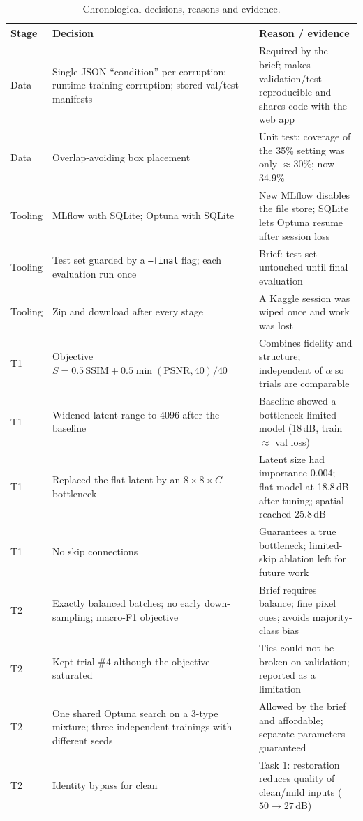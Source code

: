\documentclass[conference]{IEEEtran}
\begin{document}
\begin{table}[t]
\caption{Chronological decisions, reasons and evidence.}
\label{tab:log}
\centering\footnotesize
\begin{tabular}{@{}lp{6.4cm}p{8.6cm}@{}}
\toprule
Stage & Decision & Reason / evidence\\
\midrule
Data & Single JSON ``condition'' per corruption; runtime training corruption; stored val/test manifests & Required by the brief; makes validation/test reproducible and shares code with the web app\\
Data & Overlap-avoiding box placement & Unit test: coverage of the 35\% setting was only $\approx$30\%; now 34.9\%\\
Tooling & MLflow with SQLite; Optuna with SQLite & New MLflow disables the file store; SQLite lets Optuna resume after session loss\\
Tooling & Test set guarded by a \texttt{--final} flag; each evaluation run once & Brief: test set untouched until final evaluation\\
Tooling & Zip and download after every stage & A Kaggle session was wiped once and work was lost\\
T1 & Objective $S=0.5\,\mathrm{SSIM}+0.5\min(\mathrm{PSNR},40)/40$ & Combines fidelity and structure; independent of $\alpha$ so trials are comparable\\
T1 & Widened latent range to 4096 after the baseline & Baseline showed a bottleneck-limited model (18\,dB, train $\approx$ val loss)\\
T1 & Replaced the flat latent by an $8{\times}8{\times}C$ bottleneck & Latent size had importance 0.004; flat model at 18.8\,dB after tuning; spatial reached 25.8\,dB\\
T1 & No skip connections & Guarantees a true bottleneck; limited-skip ablation left for future work\\
T2 & Exactly balanced batches; no early down-sampling; macro-F1 objective & Brief requires balance; fine pixel cues; avoids majority-class bias\\
T2 & Kept trial \#4 although the objective saturated & Ties could not be broken on validation; reported as a limitation\\
T2 & One shared Optuna search on a 3-type mixture; three independent trainings with different seeds & Allowed by the brief and affordable; separate parameters guaranteed\\
T2 & Identity bypass for clean & Task 1: restoration reduces quality of clean/mild inputs ($50\to27$\,dB)\\

\end{tabular}
\end{table}
\end{document}
